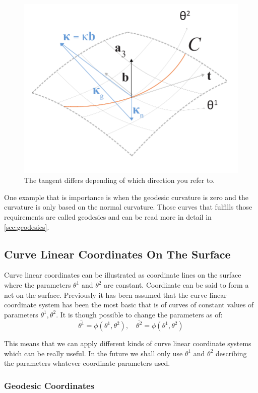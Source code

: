 \begin{figure}[H]
\centering
\includegraphics[height=0.6\linewidth ]{figure/Theory/SFF.pdf}
\caption{The tangent differs depending of which direction you refer to. }
\label{fig:GeoCurvature}
\end{figure}

One example that is importance is when the geodesic curvature is zero and the curvature is only based on the normal curvature. Those curves that fulfills those requirements are called geodesics and can be read more in detail in \ref{sec:geodesics}.

\subsection{Curve Linear Coordinates On The Surface} \label{sec:curveLinearCoord}

Curve linear coordinates can be illustrated as coordinate lines on the surface where the parameters $\theta^1$ and $\theta^2$ are constant. Coordinate can be said to form a net on the surface.
Previously it has been assumed that the curve linear coordinate system has been the most basic that is of curves of constant values of parameters $\theta^1,\theta^2$. It is though possible to change the parameters as of:
\begin{equation}
\bar{\theta^1} = \phi(\theta^1,\theta^2),\quad \bar{\theta^2} = \phi(\theta^1,\theta^2)
\end{equation}

This means that we can apply different kinds of curve linear coordinate systems which can be really useful. In the future we shall only use $\theta^1$ and $\theta^2$ describing the parameters whatever coordinate parameters used.

\subsubsection{Geodesic Coordinates}\label{sec:geoCord}

